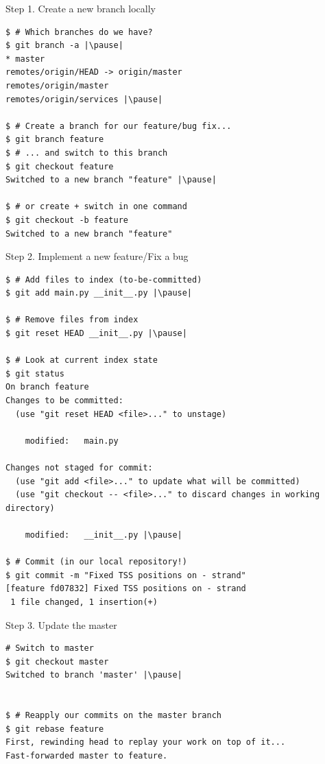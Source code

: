 \begin{frame}[fragile]{Step 1. Create a new branch locally}
	\begin{lstlisting}
$ # Which branches do we have?
$ git branch -a |\pause|
* master
remotes/origin/HEAD -> origin/master
remotes/origin/master
remotes/origin/services |\pause|

$ # Create a branch for our feature/bug fix...
$ git branch feature
$ # ... and switch to this branch
$ git checkout feature 
Switched to a new branch "feature" |\pause|

$ # or create + switch in one command
$ git checkout -b feature 
Switched to a new branch "feature"
  	\end{lstlisting}
\end{frame}

\begin{frame}[fragile]{Step 2. Implement a new feature/Fix a bug}
  	\begin{lstlisting}
$ # Add files to index (to-be-committed)
$ git add main.py __init__.py |\pause|

$ # Remove files from index
$ git reset HEAD __init__.py |\pause|

$ # Look at current index state
$ git status
On branch feature
Changes to be committed:
  (use "git reset HEAD <file>..." to unstage)

	modified:   main.py

Changes not staged for commit:
  (use "git add <file>..." to update what will be committed)
  (use "git checkout -- <file>..." to discard changes in working directory)

	modified:   __init__.py |\pause|

$ # Commit (in our local repository!)
$ git commit -m "Fixed TSS positions on - strand"
[feature fd07832] Fixed TSS positions on - strand
 1 file changed, 1 insertion(+)
  	\end{lstlisting}
\end{frame}


\begin{frame}[fragile]{Step 3. Update the master}
  	\begin{lstlisting}
# Switch to master
$ git checkout master
Switched to branch 'master' |\pause|


$ # Reapply our commits on the master branch
$ git rebase feature
First, rewinding head to replay your work on top of it...
Fast-forwarded master to feature.
	\end{lstlisting}
\end{frame}


